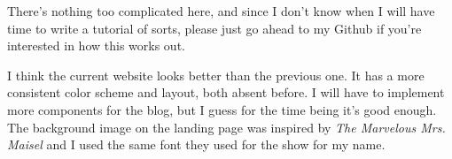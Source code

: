 \noindent There's nothing too complicated here, and since I don't know when I will have time to write a tutorial of sorts, please just go ahead to my Github if you're interested in how this works out.

I think the current website looks better than the previous one. It has a more consistent color scheme and layout, both absent before. I will have to implement more components for the blog, but I guess for the time being it's good enough. The background image on the landing page was inspired by \textit{The Marvelous Mrs. Maisel} and I used the same font they used for the show for my name. 